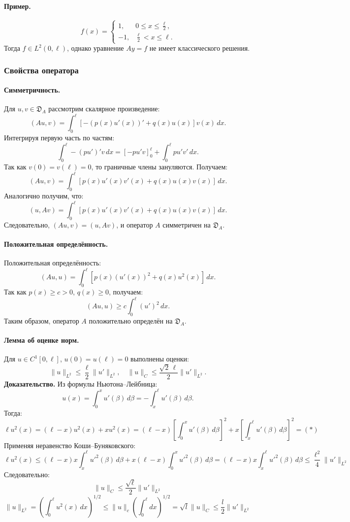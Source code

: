 \paragraph{Пример.}
\[
f(x) =
\begin{cases}
1, & 0 \leq x \leq \frac{\ell}{2}, \\
-1, & \frac{\ell}{2} < x \leq \ell.
\end{cases}
\]
Тогда $f \in L^2(0,\ell)$, однако уравнение $A y = f$ не имеет классического решения.

\subsubsection{Свойства оператора}

\paragraph{Симметричность.} Для $u, v \in \mathfrak{D}_A$ рассмотрим скалярное произведение:
\[
(A u, v) = \int_0^\ell \left[-(p(x) u'(x))' + q(x) u(x)\right] v(x) \, dx.
\]
Интегрируя первую часть по частям:
\[
\int_0^\ell -(p u')' v \, dx = \left[-p u' v \right]_0^\ell + \int_0^\ell p u' v' \, dx.
\]
Так как $v(0) = v(\ell) = 0$, то граничные члены зануляются. Получаем:
\[
(A u, v) = \int_0^\ell \left[ p(x) u'(x) v'(x) + q(x) u(x) v(x) \right] \, dx.
\]
Аналогично получим, что:
\[
(u, A v) = \int_0^\ell \left[ p(x) u'(x) v'(x) + q(x) u(x) v(x) \right] \, dx.
\]
Следовательно, $(A u, v) = (u, A v)$, и оператор $A$ симметричен на $ \mathfrak{D}_A $.

\paragraph{Положительная определённость.} Положительная определённость:
\[
(A u, u) = \int_0^\ell \left[ p(x) (u'(x))^2 + q(x) u^2(x) \right] \, dx.
\]
Так как $p(x) \ge c > 0$, $q(x) \ge 0$, получаем:
\[
(A u, u) \ge c \int_0^\ell (u')^2 \, dx.
\]
Таким образом, оператор $A$ положительно определён на $\mathfrak{D}_A$.

\paragraph{Лемма об оценке норм.} Для $u \in C^1[0,\ell]$, $u(0) = u(\ell) = 0$ выполнены оценки:
\[
\|u\|_{L^2} \le \frac{\ell}{2} \|u'\|_{L^2}, \quad \|u\|_C \le \frac{\sqrt{2} \, \ell}{2} \|u'\|_{L^2}.
\]
\textbf{Доказательство.} Из формулы Ньютона--Лейбница:
\[
u(x) = \int_0^x u'(\beta) \, d\beta = -\int_x^\ell u'(\beta) \, d\beta.
\]
Тогда:
\[
\ell u^2(x) = (\ell - x) u^2(x) + x u^2(x) =
(\ell - x) \left[ \int_0^x u'(\beta) \, d\beta \right]^2 + x \left[ \int_x^\ell u'(\beta) \, d\beta \right]^2
= (*)
\]
Применяя неравенство Коши--Буняковского:
\[
\ell u^2(x) \le (\ell - x) x \int_x^\ell u'^2(\beta) \, d\beta + x (\ell - x) \int_0^x u'^2(\beta) \, d\beta = (\ell - x) x \int_x^\ell u'^2(\beta) \, d\beta \le \frac{\ell^2}{4} \|u'\|_{L^2}
\]
Следовательно:
\[
    \|u\|_C \le \frac{\sqrt{\ell}}{2} \|u'\|_{L^2}
\]
\[
    \|u\|_{L^2} = \left( \int_0^\ell u^2(x) \, dx \right)^{1/2} \le \|u\|_c \left( \int_0^\ell dx \right)^{1/2} = \sqrt{l} \|u\|_C \le \frac{l}{2} \|u'\|_{L^2}
\]

